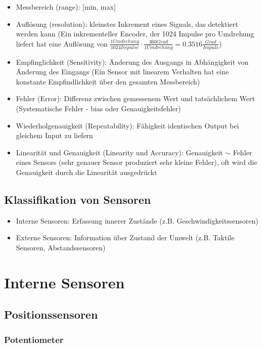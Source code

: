 \documentclass[paper=a4, fontsize=11pt]{scrartcl} %
\numberwithin{equation}{section} %
\numberwithin{figure}{section} %
\numberwithin{table}{section} %
\begin{document}
\begin{itemize}
\item Messbereich (range): [min, max]
\item Auflösung (resolution): kleinstes Inkrement eines Signals, das detektiert werden kann (Ein inkrementeller Encoder, der 1024 Impulse pro Umdrehung liefert hat eine Auflösung von $\frac{1 Umdrehung}{1024 Impulse} \cdot \frac{360 Grad}{1 Umdrehung} = 0.3516 \frac{Grad}{Impuls}$)
\item Empfinglichkeit (Sensitivity): Änderung des Ausgangs in Abhängigkeit von Änderung des Eingangs (Ein Sensor mit linearem Verhalten hat eine konstante Empfindlichkeit über den gesamten Messbereich)
\item Fehler (Error): Differenz zwischen gemessenem Wert und tatsächlichem Wert (Systematische Fehler - bias oder Genauigkeitsfehler)
\item Wiederholgenauigkeit (Repeatability): Fähigkeit identischen Output bei gleichem Input zu liefern
\item Linearität und Genauigkeit (Linearity und Accuracy): Genauigkeit $\sim$ Fehler eines Sensors (sehr genauer Sensor produziert sehr kleine Fehler), oft wird die Genauigkeit durch die Linearität ausgedrückt
\end{itemize}

\subsection{Klassifikation von Sensoren}

\begin{itemize}
\item Interne Sensoren: Erfassung innerer Zustände (z.B. Geschwindigkeitssensoren)
\item Externe Sensoren: Information über Zustand der Umwelt (z.B. Taktile Sensoren, Abstandssensoren)
\end{itemize}

\section{Interne Sensoren}

\subsection{Positionssensoren}

\subsubsection{Potentiometer}
\end{document}
